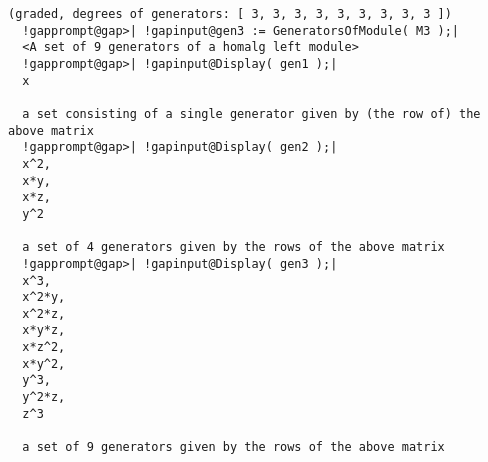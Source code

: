 \documentclass[a4paper,11pt]{report}
\begin{document}
{{{\begin{Verbatim}[commandchars=!@|,fontsize=\small,frame=single,label=Example]
  (graded, degrees of generators: [ 3, 3, 3, 3, 3, 3, 3, 3, 3 ])
  !gapprompt@gap>| !gapinput@gen3 := GeneratorsOfModule( M3 );|
  <A set of 9 generators of a homalg left module>
  !gapprompt@gap>| !gapinput@Display( gen1 );|
  x
  
  a set consisting of a single generator given by (the row of) the above matrix
  !gapprompt@gap>| !gapinput@Display( gen2 );|
  x^2,
  x*y,
  x*z,
  y^2 
  
  a set of 4 generators given by the rows of the above matrix
  !gapprompt@gap>| !gapinput@Display( gen3 );|
  x^3,  
  x^2*y,
  x^2*z,
  x*y*z,
  x*z^2,
  x*y^2,
  y^3,  
  y^2*z,
  z^3   
  
  a set of 9 generators given by the rows of the above matrix
\end{Verbatim}
 }

 }

  }

   
\end{document}
